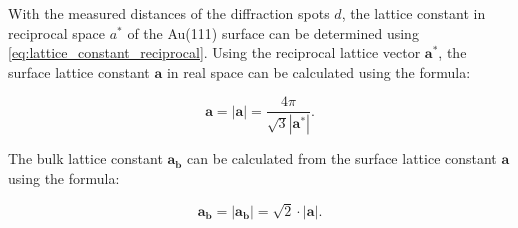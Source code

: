 \documentclass[fontsize=11pt,reqno,a4paper,oneside]{scrartcl}
\begin{document}
With the measured distances of the diffraction spots $d$, the lattice constant in reciprocal space $a^*$ of the Au(111) surface can be determined using \autoref{eq:lattice_constant_reciprocal}. Using the reciprocal lattice vector $\mathbf{a^*}$, the surface lattice constant $\mathbf{a}$ in real space can be calculated using the formula:

\begin{equation}
    \mathbf{a} = |\mathbf{a}| = \frac{4\pi}{\sqrt{3}|\mathbf{a^*}|}.
    \label{eq:lattice_constant_real}
\end{equation}

The bulk lattice constant $\mathbf{a_b}$ can be calculated from the surface lattice constant $\mathbf{a}$ using the formula:

\begin{equation}
    \mathbf{a_b} = |\mathbf{a_b}| =  \sqrt{2} \cdot |\mathbf{a}|.
    \label{eq:lattice_constant_bulk}
\end{equation}
\end{document}
